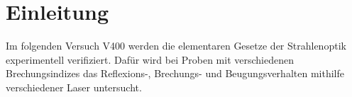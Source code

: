\section{Einleitung}
\label{sec:einleitung}
Im folgenden Versuch V400 werden die elementaren Gesetze der Strahlenoptik
experimentell verifiziert. Dafür wird bei Proben mit verschiedenen Brechungsindizes
das Reflexions-, Brechungs- und Beugungsverhalten mithilfe verschiedener
Laser untersucht.
